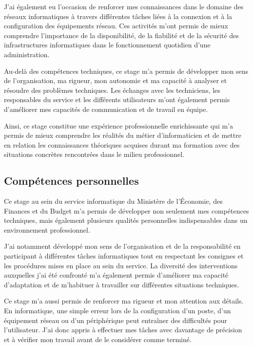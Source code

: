 \documentclass[12pt,a4paper]{article}
\begin{document}
J’ai également eu l’occasion de renforcer mes connaissances dans le domaine des réseaux informatiques à travers différentes tâches liées à la connexion et à la configuration des équipements réseau. Ces activités m’ont permis de mieux comprendre l’importance de la disponibilité, de la fiabilité et de la sécurité des infrastructures informatiques dans le fonctionnement quotidien d’une administration.

Au-delà des compétences techniques, ce stage m’a permis de développer mon sens de l’organisation, ma rigueur, mon autonomie et ma capacité à analyser et résoudre des problèmes techniques. Les échanges avec les techniciens, les responsables du service et les différents utilisateurs m’ont également permis d’améliorer mes capacités de communication et de travail en équipe.

Ainsi, ce stage constitue une expérience professionnelle enrichissante qui m’a permis de mieux comprendre les réalités du métier d’informaticien et de mettre en relation les connaissances théoriques acquises durant ma formation avec des situations concrètes rencontrées dans le milieu professionnel.


\subsection{Compétences personnelles}

Ce stage au sein du service informatique du Ministère de l’Économie, des Finances et du Budget m’a permis de développer non seulement mes compétences techniques, mais également plusieurs qualités personnelles indispensables dans un environnement professionnel.

J’ai notamment développé mon sens de l’organisation et de la responsabilité en participant à différentes tâches informatiques tout en respectant les consignes et les procédures mises en place au sein du service. La diversité des interventions auxquelles j’ai été confronté m’a également permis d’améliorer ma capacité d’adaptation et de m’habituer à travailler sur différentes situations techniques.

Ce stage m’a aussi permis de renforcer ma rigueur et mon attention aux détails. En informatique, une simple erreur lors de la configuration d’un poste, d’un équipement réseau ou d’un périphérique peut entraîner des difficultés pour l’utilisateur. J’ai donc appris à effectuer mes tâches avec davantage de précision et à vérifier mon travail avant de le considérer comme terminé.
\end{document}
